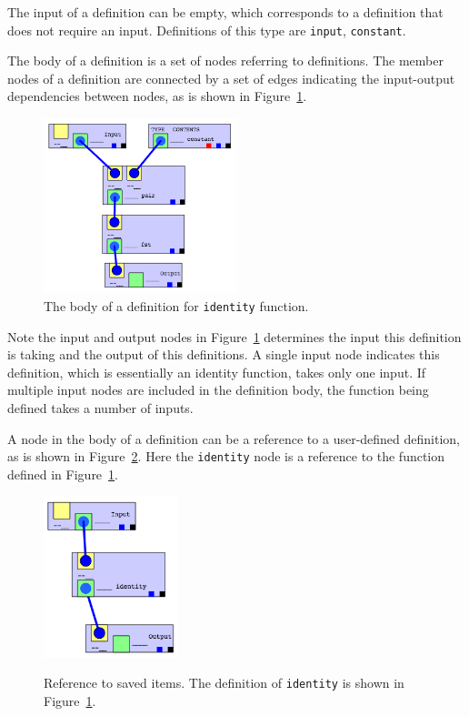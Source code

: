 \documentclass[12pt,UTF8,a4]{article}
\newcommand{\code}[1]{\texttt{#1}}
\begin{document}
The input of a definition can be empty, which corresponds to a definition that does not require an input. Definitions of this type are \code{input}, \code{constant}.

The body of a definition is a set of nodes referring to definitions. The member nodes of a definition are connected by a set of edges indicating the input-output dependencies between nodes, as is shown in Figure~\ref{fig:defbody}.

\begin{figure}[!ht]
\center
\includegraphics[width=0.5\textwidth]{./images/defbody}
\caption{The body of a definition for \code{identity} function.}\label{fig:defbody}
\end{figure}

Note the input and output nodes in Figure~\ref{fig:defbody} determines the input this definition is taking and the output of this definitions. A single input node indicates this definition, which is essentially an identity function, takes only one input. If multiple input nodes are included in the definition body, the function being defined takes a number of inputs.

A node in the body of a definition can be a reference to a user-defined definition, as is shown in Figure~\ref{fig:ref}. Here the \code{identity} node is a reference to the function defined in Figure~\ref{fig:defbody}.
\begin{figure}[!ht]
\center
\includegraphics[width=0.35\textwidth]{./images/ref} \\
\caption{Reference to saved items. The definition of \code{identity} is shown in Figure~\ref{fig:defbody}.}\label{fig:ref}
\end{figure}
\end{document}
